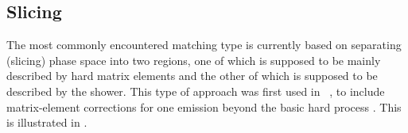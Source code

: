 \subsection{Slicing}
 The most commonly encountered matching type is
  currently based on separating (slicing)
  phase space into two regions, one of which is supposed to be
  mainly described by hard matrix elements and the other of which is
  supposed to be described by the shower. This type of 
  approach was first 
  used in \Hw~\cite{Corcella:2000bw}, to
  include matrix-element corrections for one emission beyond the 
  basic hard process \cite{Seymour:1994we,Seymour:1994df}.
  This is illustrated in .
\begin{figure}
\begin{center}%
\end{center}
\end{figure}
